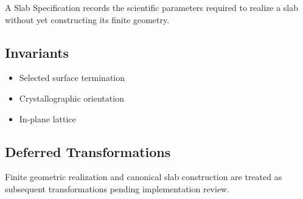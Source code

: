A Slab Specification records the scientific parameters required to
realize a slab without yet constructing its finite geometry.

\subsection{Invariants}

\begin{itemize}
\item Selected surface termination
\item Crystallographic orientation
\item In-plane lattice
\end{itemize}

\subsection{Deferred Transformations}

Finite geometric realization and canonical slab construction are treated
as subsequent transformations pending implementation review.
